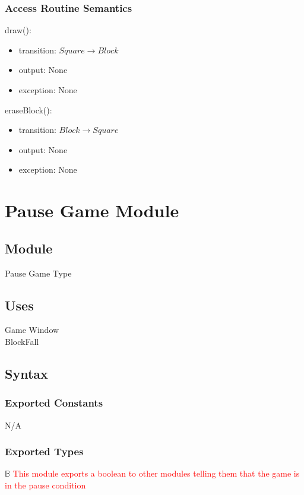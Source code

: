 \documentclass[12pt]{article}
\begin{document}
\subsubsection* {Access Routine Semantics}

\noindent draw():
\begin{itemize}
\item transition: $Square \rightarrow Block$
\item output: None
\item exception: None
\end{itemize}

\noindent eraseBlock():
\begin{itemize}
\item transition: $Block \rightarrow Square$
\item output: None
\item exception: None
\end{itemize}

\newpage

\section* {Pause Game Module}

\subsection*{Module}

Pause Game Type

\subsection* {Uses}

Game Window\\
BlockFall

\subsection* {Syntax}

\subsubsection* {Exported Constants}
N/A
\subsubsection* {Exported Types}

$\mathbb{B}$ \textcolor{red}{This module exports a boolean to other modules telling them that the game is in the pause condition} 
\end{document}
